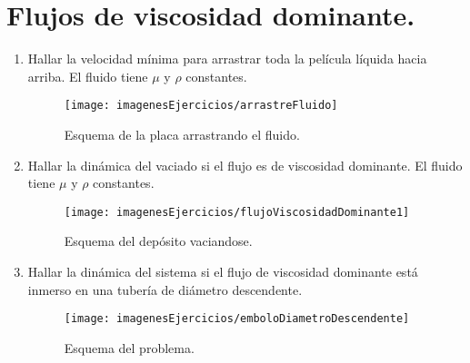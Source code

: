 \section{Flujos de viscosidad dominante.}
\begin{enumerate}
	\item Hallar la velocidad mínima para arrastrar toda la película líquida hacia arriba. El fluido tiene $\mu$ y $\rho$ constantes.
	\begin{figure}[H]
		\centering
		\texttt{[image: imagenesEjercicios/arrastreFluido]}
		\caption{Esquema de la placa arrastrando el fluido.}
		\label{fig:arrastrefluido}
	\end{figure}
	
	\item Hallar la dinámica del vaciado si el flujo es de viscosidad dominante. El fluido tiene $\mu$ y $\rho$ constantes.
	\begin{figure}[H]
		\centering
		\texttt{[image: imagenesEjercicios/flujoViscosidadDominante1]}
		\caption{Esquema del depósito vaciandose.}
		\label{fig:flujoviscosidaddominante1}
	\end{figure}
	
	\item Hallar la dinámica del sistema si el flujo de viscosidad dominante está inmerso en una tubería de diámetro descendente.
	\begin{figure}[H]
		\centering
		\texttt{[image: imagenesEjercicios/emboloDiametroDescendente]}
		\caption{Esquema del problema.}
		\label{fig:embolodiametrodescendente}
	\end{figure}
	
\end{enumerate}
\black
